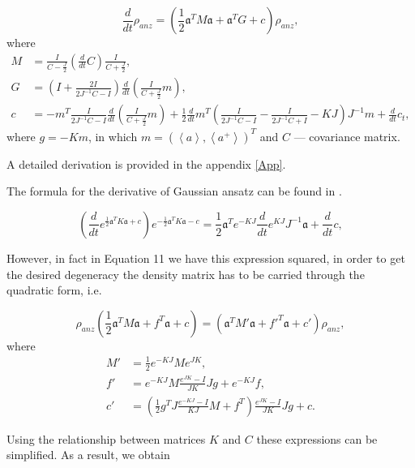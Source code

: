 \documentclass[12pt]{article}
\theoremstyle{definition}
\newcommand\bra{\left<}
\newcommand\ket{\right>}
\newcommand{\braket}[1]{\bra#1\ket}
\newcommand{\mf}[1]{\mathfrak{#1}}
\begin{document}
	\begin{equation}
		\label{eq:DerWithLin}
		\frac{d}{dt}\rho_{anz} = (\frac{1}{2}\mf{a}^TM\mf{a} + \mf{a}^TG + c)\rho_{anz},
	\end{equation}
	where
	\begin{align*}
		M &= \frac{I}{C - \frac{J}{2}}\left(\frac{d}{dt}C\right)\frac{I}{C + \frac{J}{2}},\\
		G &= \left(  I + \frac{2I}{2J^{-1}C - I}  \right)\frac{d}{dt}\left(\frac{I}{C + \frac{J}{2}}m\right),\\
		c &=-m^T\frac{I}{2J^{-1}C -  I}\frac{d}{dt}\left(\frac{I}{C + \frac{J}{2}}m\right) + \frac{1}{2}\frac{d}{dt}m^T\left( \frac{I}{2J^{-1}C - I} - \frac{I}{2J^{-1}C + I} - KJ \right)J^{-1}m + \frac{d}{dt}c_t,
	\end{align*}
	where $g = -Km$, in which $m = (\braket{a} , \braket{a^+})^T$ and $C$ --- covariance matrix.
	
	A detailed derivation is provided in the appendix \ref{App}.
	
	The formula for the derivative of Gaussian ansatz can be found in \cite{Dis}.
	
	\begin{equation}
		\label{eq:difofrho}
		\left(\dfrac{d}{dt}e^{\frac{1}{2}\mathfrak{a}^TK\mathfrak{a} + c}\right)e^{-\frac{1}{2}\mathfrak{a}^TK\mathfrak{a} - c} = \dfrac{1}{2}\mathfrak{a}^Te^{-KJ}\dfrac{d}{dt}e^{KJ}J^{-1}\mathfrak{a} + \dfrac{d}{dt}c,
	\end{equation}

	

	
	However, in fact in Equation 11 we have this expression squared, in order to get the desired degeneracy the density matrix has to be carried through the quadratic form, i.e.
	
	\begin{equation}
		\label{eq:DenMatrOverForm}
		\rho_{anz}(\frac{1}{2}\mf{a}^TM\mf{a} + f^T\mf{a} + c) = (\mf{a}^TM'\mf{a} + f'^T\mf{a} + c')\rho_{anz},
	\end{equation}
	where
	\begin{align*}
		M' &= \frac{1}{2}e^{-KJ}Me^{JK}, \\
		f' &= e^{-KJ}M\frac{e^{JK} - I}{JK}Jg + e^{-KJ}f, \\
		c' &= \left( \frac{1}{2}g^TJ\frac{e^{-KJ} - I}{KJ}M +f^T  \right)\frac{e^{JK} - I}{JK}Jg + c.
	\end{align*}
	
	Using the relationship between matrices $K$ and $C$ these expressions can be simplified. As a result, we obtain
	
\end{document}
